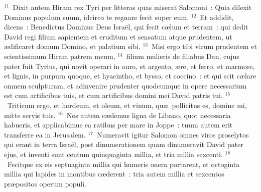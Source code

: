 ${}^{11}$~Dixit autem Hiram rex Tyri per litteras quas miserat Salomoni~: Quia dilexit Dominus populum suum, idcirco te regnare fecit super eum.
${}^{12}$~Et addidit, dicens~: Benedictus Dominus Deus Isra\"el, qui fecit c\ae lum et terram~: qui dedit David regi filium sapientem et eruditum et sensatum atque prudentem, ut \ae dificaret domum Domino, et palatium sibi.
${}^{13}$~Misi ergo tibi virum prudentem et scientissimum Hiram patrem meum,
${}^{14}$~filium mulieris de filiabus Dan, cujus pater fuit Tyrius, qui novit operari in auro, et argento, \ae re, et ferro, et marmore, et lignis, in purpura quoque, et hyacintho, et bysso, et coccino~: et qui scit c\ae lare omnem sculpturam, et adinvenire prudenter quodcumque in opere necessarium est cum artificibus tuis, et cum artificibus domini mei David patris tui.
${}^{15}$~Triticum ergo, et hordeum, et oleum, et vinum, qu\ae\ pollicitus es, domine mi, mitte servis tuis.
${}^{16}$~Nos autem c\ae demus ligna de Libano, quot necessaria habueris, et applicabimus ea ratibus per mare in Joppe~: tuum autem erit transferre ea in Jerusalem.
${}^{17}$~Numeravit igitur Salomon omnes viros proselytos qui erant in terra Isra\"el, post dinumerationem quam dinumeravit David pater ejus, et inventi sunt centum quinquaginta millia, et tria millia sexcenti.
${}^{18}$~Fecitque ex eis septuaginta millia qui humeris onera portarent, et octoginta millia qui lapides in montibus c\ae derent~: tria autem millia et sexcentos pr\ae positos operum populi.

